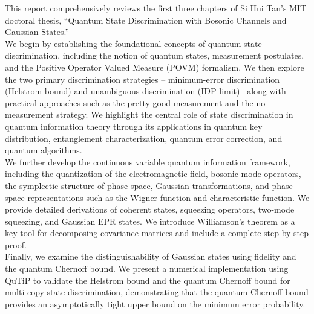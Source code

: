 This report comprehensively reviews the first three chapters of Si Hui Tan's MIT doctoral thesis, ``Quantum State Discrimination with Bosonic Channels and Gaussian States.''\\

We begin by establishing the foundational concepts of quantum state discrimination, including the notion of quantum states, measurement postulates, and the Positive Operator Valued Measure (POVM) formalism. We then explore the two primary discrimination strategies -- minimum-error discrimination (Helstrom bound) and unambiguous discrimination (IDP limit) --along with practical approaches such as the pretty-good measurement and the no-measurement strategy. We highlight the central role of state discrimination in quantum information theory through its applications in quantum key distribution, entanglement characterization, quantum error correction, and quantum algorithms.\\

We further develop the continuous variable quantum information framework, including the quantization of the electromagnetic field, bosonic mode operators, the symplectic structure of phase space, Gaussian transformations, and phase-space representations such as the Wigner function and characteristic function. We provide detailed derivations of coherent states, squeezing operators, two-mode squeezing, and Gaussian EPR states. We introduce Williamson's theorem as a key tool for decomposing covariance matrices and include a complete step-by-step proof.\\

Finally, we examine the distinguishability of Gaussian states using fidelity and the quantum Chernoff bound. We present a numerical implementation using QuTiP to validate the Helstrom bound and the quantum Chernoff bound for multi-copy state discrimination, demonstrating that the quantum Chernoff bound provides an asymptotically tight upper bound on the minimum error probability.
